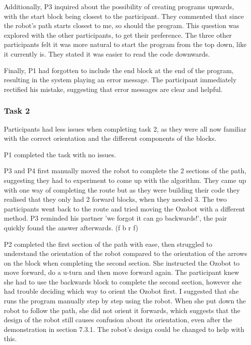 \documentclass[oneside,%
                    author={Malak Hajji},
                    degree={BSc},
                    title={Designing An Accessible Computational Toolkit For Students},
                  subtitle={With Mixed Visual Abilities}]{dissertation}
\begin{document}
Additionally, P3 inquired about the possibility of creating programs upwards, with the start block being closest to the participant. They commented that since the robot's path starts closest to me, so should the program. This question was explored with the other participants, to get their preference. The three other participants felt it was more natural to start the program from the top down, like it currently is. They stated it was easier to read the code downwards. 

Finally, P1 had forgotten to include the end block at the end of the program, resulting in the system playing an error message. The participant immediately rectified his mistake, suggesting that error messages are clear and helpful.

\subsubsection{Task 2}
Participants had less issues when completing task 2, as they were all now familiar with the correct orientation and the different components of the blocks. 

P1 completed the task with no issues.

P3 and P4 first manually moved the robot to complete the 2 sections of the path, suggesting they had to experiment to come up with the algorithm. They came up with one way of completing the route but as they were building their code they realised that they only had 2 forward blocks, when they needed 3. The two participants went back to the route and tried moving the Ozobot with a different method. P3 reminded his partner 'we forgot it can go backwards!', the pair quickly found the answer afterwards. (f b r f)

P2 completed the first section of the path with ease, then struggled to understand the orientation of the robot compared to the orientation of the arrows on the block when completing the second section. She instructed the Ozobot to move forward, do a u-turn and then move forward again. The participant knew she had to use the backwards block to complete the second section, however she had trouble deciding which way to orient the Ozobot first. I suggested that she runs the program manually step by step using the robot. When she put down the robot to follow the path, she did not orient it forwards, which suggests that the design of the robot still causes confusion about its orientation, even after the demonstration in section 7.3.1. The robot's design could be changed to help with this. 
\end{document}

